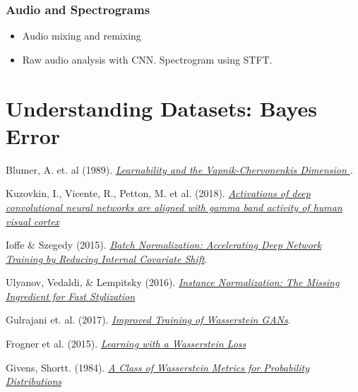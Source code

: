 \documentclass[paper=a4, fontsize=12pt]{scrartcl} %
\numberwithin{equation}{section} %
\numberwithin{figure}{section} %
\numberwithin{table}{section} %
\begin{document}
\subsubsection{Audio and Spectrograms}

\begin{itemize}
    \item Audio mixing and remixing
    \item Raw audio analysis with CNN. Spectrogram using STFT.
\end{itemize}

\pagebreak


\section{Understanding Datasets: Bayes Error}

\pagebreak


\begin{thebibliography}{999}

        Blumer, A. et. al (1989).
        \emph{\href{http://www.trhvidsten.com/docs/classics/Blumer-1989.pdf}{Learnability and the Vapnik-Chervonenkis Dimension }}.

        Kuzovkin, I., Vicente, R., Petton, M. et al. (2018).
        \emph{\href{https://www.nature.com/articles/s42003-018-0110-y}{Activations of deep convolutional neural networks are aligned with gamma band activity of human visual cortex}}

        Ioffe \& Szegedy (2015).
        \emph{\href{https://arxiv.org/abs/1502.03167}{Batch Normalization: Accelerating Deep Network Training by Reducing Internal Covariate Shift}}.

        Ulyanov, Vedaldi, \& Lempitsky (2016).
        \emph{\href{https://arxiv.org/abs/1607.08022}{Instance Normalization: The Missing Ingredient for Fast Stylization}}

        Gulrajani et. al. (2017).
        \emph{\href{https://arxiv.org/abs/1607.08022}{Improved Training of Wasserstein GANs}}.

        Frogner et al. (2015).
        \emph{\href{https://arxiv.org/abs/1506.05439}{Learning with a Wasserstein Loss}}

        Givens, Shortt. (1984).
        \emph{\href{https://projecteuclid.org/download/pdf_1/euclid.mmj/1029003026}{A Class of Wasserstein Metrics for Probability Distributions}}

\end{thebibliography}

\vfill

\end{document}
